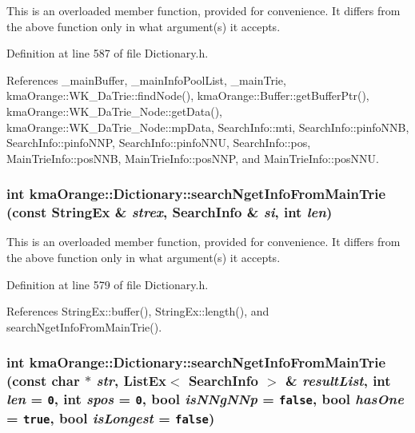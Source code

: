 This is an overloaded member function, provided for convenience. It differs from the above function only in what argument(s) it accepts. 

Definition at line 587 of file Dictionary.h.

References \_\-mainBuffer, \_\-mainInfoPoolList, \_\-mainTrie, kmaOrange::WK\_\-DaTrie::findNode(), kmaOrange::Buffer::getBufferPtr(), kmaOrange::WK\_\-DaTrie\_\-Node::getData(), kmaOrange::WK\_\-DaTrie\_\-Node::mpData, SearchInfo::mti, SearchInfo::pinfoNNB, SearchInfo::pinfoNNP, SearchInfo::pinfoNNU, SearchInfo::pos, MainTrieInfo::posNNB, MainTrieInfo::posNNP, and MainTrieInfo::posNNU.\hypertarget{classkmaOrange_1_1Dictionary_1c0ebb7bbf16dff682227a7d48d2182e}{
\subsubsection[{searchNgetInfoFromMainTrie}]{\setlength{\rightskip}{0pt plus 5cm}int kmaOrange::Dictionary::searchNgetInfoFromMainTrie (const {\bf StringEx} \& {\em strex}, \/  {\bf SearchInfo} \& {\em si}, \/  int {\em len})}}
\label{classkmaOrange_1_1Dictionary_1c0ebb7bbf16dff682227a7d48d2182e}


This is an overloaded member function, provided for convenience. It differs from the above function only in what argument(s) it accepts. 

Definition at line 579 of file Dictionary.h.

References StringEx::buffer(), StringEx::length(), and searchNgetInfoFromMainTrie().\hypertarget{classkmaOrange_1_1Dictionary_7bac38f3c179eb270b9b02466252f6f1}{
\subsubsection[{searchNgetInfoFromMainTrie}]{\setlength{\rightskip}{0pt plus 5cm}int kmaOrange::Dictionary::searchNgetInfoFromMainTrie (const char $\ast$ {\em str}, \/  {\bf ListEx}$<$ {\bf SearchInfo} $>$ \& {\em resultList}, \/  int {\em len} = {\tt 0}, \/  int {\em spos} = {\tt 0}, \/  bool {\em isNNgNNp} = {\tt false}, \/  bool {\em hasOne} = {\tt true}, \/  bool {\em isLongest} = {\tt false})}}
\label{classkmaOrange_1_1Dictionary_7bac38f3c179eb270b9b02466252f6f1}


